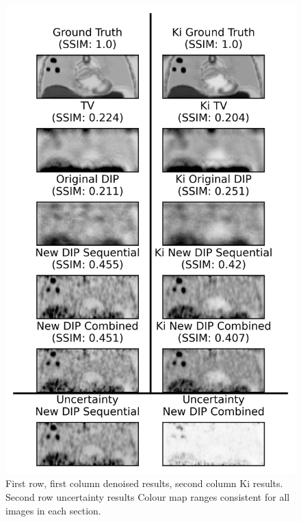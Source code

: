 \documentclass[portrait, color=UCLburgundy, margin=1cm]{uclposter}
\begin{document}
\begin{multicols}{2}
\begin{figure}[H]
                \includegraphics[width=0.9\linewidth]{visual_analysis.png}
                
                \begin{highlightbox}[UCLlightblue]
                    \captionsetup{singlelinecheck=false, justification=centering}
                    \caption{First row, first column denoised results, second column Ki results. Second row uncertainty results Colour map ranges consistent for all images in each section.}
                \end{highlightbox}
                
                \label{fig:visual_analysis}
            \end{figure}
            
            \begin{figure}[H]
                \centering
            

\end{figure}
\end{multicols}
\end{document}
